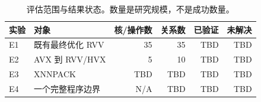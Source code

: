 \begin{table}[htbp]
\centering
\small
\caption{评估范围与结果状态。数量是研究规模，不是成功数量。}
\label{tab:scope}
\begin{tabular}{@{}llrrrr@{}}
\toprule
实验 & 对象 & 核/操作数 & 关系数 & 已验证 & 未解决 \\
\midrule
E1 & 既有最终优化 RVV & 35 & 35 & TBD & TBD \\
E2 & AVX 到 RVV/HVX & 5 & 10 & TBD & TBD \\
E3 & XNNPACK & TBD & TBD & TBD & TBD \\
E4 & 一个完整程序边界 & N/A & TBD & TBD & TBD \\
\bottomrule
\end{tabular}
\end{table}

